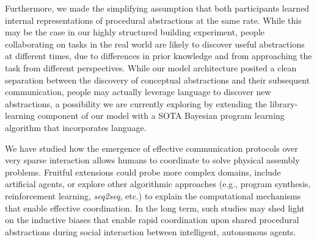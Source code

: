 \documentclass[10pt,letterpaper]{article}
\begin{document}
Furthermore, we made the simplifying assumption that both participants learned internal representations of procedural abstractions at the same rate.
While this may be the case in our highly structured building experiment, people collaborating on tasks in the real world are likely to discover useful abstractions at different times, due to differences in prior knowledge and from approaching the task from different perspectives.
While our model architecture posited a clean separation between the discovery of conceptual abstractions and their subsequent communication, people may actually leverage language to discover new abstractions, a possibility we are currently exploring by extending the library-learning component of our model with a SOTA Bayesian program learning algorithm that incorporates language. %

We have studied how the emergence of effective communication protocols over very sparse interaction allows humans to coordinate to solve physical assembly problems. Fruitful extensions could probe more complex domains, include artificial agents, or explore other algorithmic approaches (e.g., program synthesis, reinforcement learning, \textit{seq2seq}, etc.) to explain the computational mechanisms that enable effective coordination.
In the long term, such studies may shed light on the inductive biases that enable rapid coordination upon shared procedural abstractions during social interaction between intelligent, autonomous agents.




\end{document}
